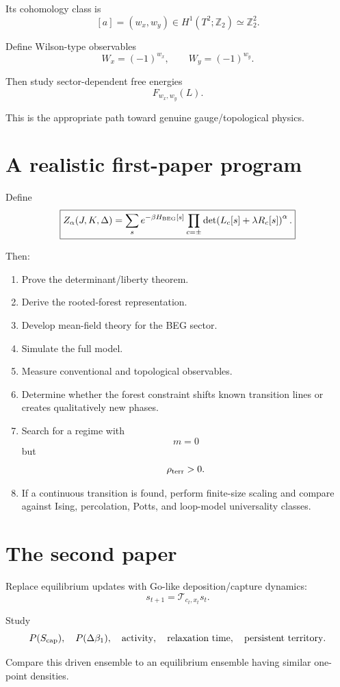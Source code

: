 \documentclass[11pt]{article}
\begin{document}
Its cohomology class is
\[
[a]=(w_x,w_y)
\in
H^1(T^2;\mathbb Z_2)
\simeq
\mathbb Z_2^2.
\]

Define Wilson-type observables
\[
W_x=(-1)^{w_x},
\qquad
W_y=(-1)^{w_y}.
\]

Then study sector-dependent free energies
\[
F_{w_x,w_y}(L).
\]

This is the appropriate path toward genuine gauge/topological physics.

\section{A realistic first-paper program}

Define
\[
\boxed{
Z_\alpha(J,K,\Delta)
=
\sum_s
e^{-\beta H_{\rm BEG}[s]}
\prod_{c=\pm}
\det\!\left(
L_c[s]+\lambda R_c[s]
\right)^\alpha.
}
\]

Then:

\begin{enumerate}
\item Prove the determinant/liberty theorem.
\item Derive the rooted-forest representation.
\item Develop mean-field theory for the BEG sector.
\item Simulate the full model.
\item Measure conventional and topological observables.
\item Determine whether the forest constraint shifts known transition lines or creates qualitatively new phases.
\item Search for a regime with
\[
m=0
\]
but
\[
\rho_{\rm terr}>0.
\]
\item If a continuous transition is found, perform finite-size scaling and compare against Ising, percolation, Potts, and loop-model universality classes.
\end{enumerate}

\section{The second paper}

Replace equilibrium updates with Go-like deposition/capture dynamics:
\[
s_{t+1}
=
\mathcal T_{c_t,x_t}s_t.
\]

Study
\[
P(S_{\rm cap}),
\quad
P(\Delta\beta_1),
\quad
\text{activity},
\quad
\text{relaxation time},
\quad
\text{persistent territory}.
\]

Compare this driven ensemble to an equilibrium ensemble having similar one-point densities.
\end{document}
